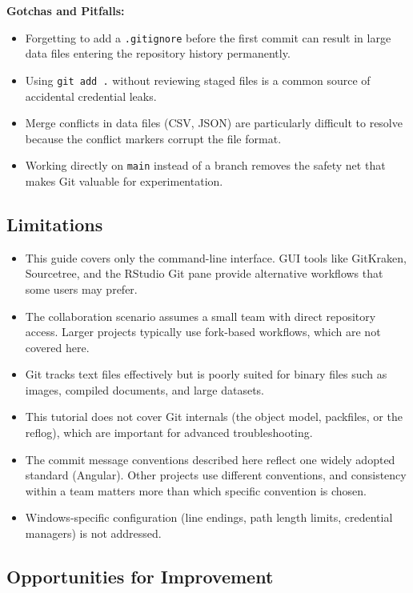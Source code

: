 \documentclass[
  letterpaper,
  DIV=11,
  numbers=noendperiod]{scrartcl}
\providecommand{\tightlist}{%
  \setlength{\itemsep}{0pt}\setlength{\parskip}{0pt}}
\begin{document}
\textbf{Gotchas and Pitfalls:}

\begin{itemize}
\tightlist
\item
  Forgetting to add a \texttt{.gitignore} before the first commit can
  result in large data files entering the repository history
  permanently.
\item
  Using \texttt{git\ add\ .} without reviewing staged files is a common
  source of accidental credential leaks.
\item
  Merge conflicts in data files (CSV, JSON) are particularly difficult
  to resolve because the conflict markers corrupt the file format.
\item
  Working directly on \texttt{main} instead of a branch removes the
  safety net that makes Git valuable for experimentation.
\end{itemize}

\subsection{Limitations}\label{limitations}

\begin{itemize}
\tightlist
\item
  This guide covers only the command-line interface. GUI tools like
  GitKraken, Sourcetree, and the RStudio Git pane provide alternative
  workflows that some users may prefer.
\item
  The collaboration scenario assumes a small team with direct repository
  access. Larger projects typically use fork-based workflows, which are
  not covered here.
\item
  Git tracks text files effectively but is poorly suited for binary
  files such as images, compiled documents, and large datasets.
\item
  This tutorial does not cover Git internals (the object model,
  packfiles, or the reflog), which are important for advanced
  troubleshooting.
\item
  The commit message conventions described here reflect one widely
  adopted standard (Angular). Other projects use different conventions,
  and consistency within a team matters more than which specific
  convention is chosen.
\item
  Windows-specific configuration (line endings, path length limits,
  credential managers) is not addressed.
\end{itemize}

\subsection{Opportunities for
Improvement}\label{opportunities-for-improvement}
\end{document}
